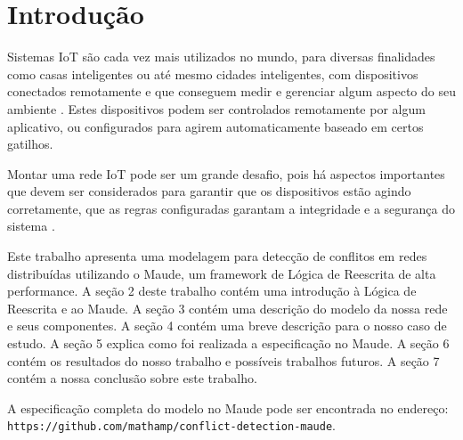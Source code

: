 \section{Introdução} \label{sec:chap1}

Sistemas IoT são cada vez mais utilizados no mundo, para diversas finalidades como casas inteligentes ou até mesmo cidades inteligentes, com dispositivos conectados remotamente e que conseguem medir e gerenciar algum aspecto do seu ambiente \cite{ConflictDetectionSurvey}. Estes dispositivos podem ser controlados remotamente por algum aplicativo, ou configurados para agirem automaticamente baseado em certos gatilhos.

Montar uma rede IoT pode ser um grande desafio, pois há aspectos importantes que devem ser considerados para garantir que os dispositivos estão agindo corretamente, que as regras configuradas garantam a integridade e a segurança do sistema \cite{ConflictDetectionFuture}.

Este trabalho apresenta uma modelagem para detecção de conflitos em redes distribuídas utilizando o Maude, um framework de Lógica de Reescrita de alta performance. A seção 2 deste trabalho contém uma introdução à Lógica de Reescrita e ao Maude. A seção 3 contém uma descrição do modelo da nossa rede e seus componentes. A seção 4 contém uma breve descrição para o nosso caso de estudo. A seção 5 explica como foi realizada a especificação no Maude. A seção 6 contém os resultados do nosso trabalho e possíveis trabalhos futuros. A seção 7 contém a nossa conclusão sobre este trabalho.

A especificação completa do modelo no Maude pode ser encontrada no endereço: \texttt{https://github.com/mathamp/conflict-detection-maude}.